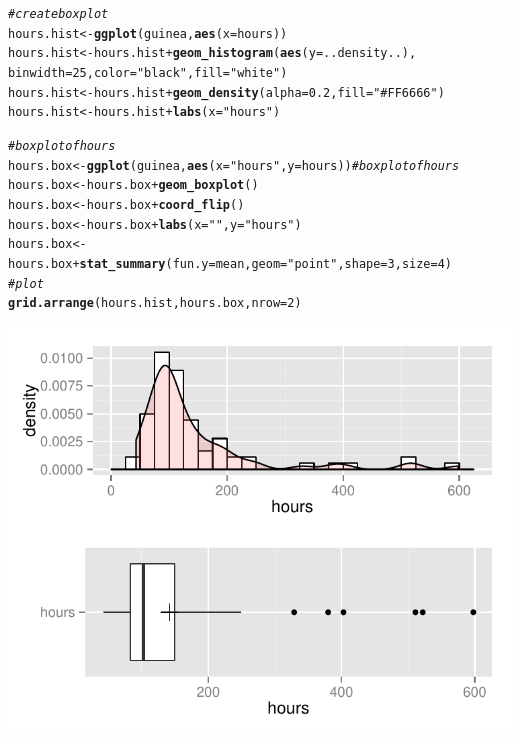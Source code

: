 \documentclass{article}\usepackage[]{graphicx}\usepackage[]{color}
\makeatletter
\def\maxwidth{ %
  \ifdim\Gin@nat@width>\linewidth
    \linewidth
  \else
    \Gin@nat@width
  \fi
}
\newcommand{\hlnum}[1]{\textcolor[rgb]{0.686,0.059,0.569}{#1}}%
\newcommand{\hlstr}[1]{\textcolor[rgb]{0.192,0.494,0.8}{#1}}%
\newcommand{\hlcom}[1]{\textcolor[rgb]{0.678,0.584,0.686}{\textit{#1}}}%
\newcommand{\hlopt}[1]{\textcolor[rgb]{0,0,0}{#1}}%
\newcommand{\hlstd}[1]{\textcolor[rgb]{0.345,0.345,0.345}{#1}}%
\newcommand{\hlkwb}[1]{\textcolor[rgb]{0.69,0.353,0.396}{#1}}%
\newcommand{\hlkwc}[1]{\textcolor[rgb]{0.333,0.667,0.333}{#1}}%
\newcommand{\hlkwd}[1]{\textcolor[rgb]{0.737,0.353,0.396}{\textbf{#1}}}%
\newenvironment{kframe}{%
 \def\at@end@of@kframe{}%
 \ifinner\ifhmode%
  \def\at@end@of@kframe{\end{minipage}}%
  \begin{minipage}{\columnwidth}%
 \fi\fi%
 \def\FrameCommand##1{\hskip\@totalleftmargin \hskip-\fboxsep
 \colorbox{shadecolor}{##1}\hskip-\fboxsep
     \hskip-\linewidth \hskip-\@totalleftmargin \hskip\columnwidth}%
 \MakeFramed {\advance\hsize-\width
   \@totalleftmargin\z@ \linewidth\hsize
   \@setminipage}}%
 {\par\unskip\endMakeFramed%
 \at@end@of@kframe}
\newenvironment{knitrout}{}{} %
\makeatother
\begin{document}
\begin{knitrout}
\color{fgcolor}\begin{kframe}
\begin{alltt}
\hlcom{#create box plot}
\hlstd{hours.hist} \hlkwb{<-} \hlkwd{ggplot}\hlstd{(guinea,} \hlkwd{aes}\hlstd{(}\hlkwc{x} \hlstd{= hours))}
\hlstd{hours.hist} \hlkwb{<-} \hlstd{hours.hist} \hlopt{+} \hlkwd{geom_histogram}\hlstd{(}\hlkwd{aes}\hlstd{(} \hlkwc{y}\hlstd{= ..density..),}
                                          \hlkwc{binwidth} \hlstd{=} \hlnum{25}\hlstd{,}\hlkwc{color} \hlstd{=} \hlstr{"black"}\hlstd{,} \hlkwc{fill} \hlstd{=} \hlstr{"white"}\hlstd{)}
\hlstd{hours.hist} \hlkwb{<-} \hlstd{hours.hist} \hlopt{+} \hlkwd{geom_density}\hlstd{(}\hlkwc{alpha} \hlstd{=} \hlnum{0.2}\hlstd{,} \hlkwc{fill} \hlstd{=} \hlstr{"#FF6666"}\hlstd{)}
\hlstd{hours.hist} \hlkwb{<-} \hlstd{hours.hist} \hlopt{+} \hlkwd{labs}\hlstd{(}\hlkwc{x} \hlstd{=} \hlstr{"hours"}\hlstd{)}

\hlcom{# boxplot of hours}
\hlstd{hours.box} \hlkwb{<-} \hlkwd{ggplot}\hlstd{(guinea,} \hlkwd{aes}\hlstd{(}\hlkwc{x} \hlstd{=} \hlstr{"hours"}\hlstd{,} \hlkwc{y} \hlstd{= hours))} \hlcom{# boxplot of hours}
\hlstd{hours.box} \hlkwb{<-} \hlstd{hours.box} \hlopt{+} \hlkwd{geom_boxplot}\hlstd{()}
\hlstd{hours.box} \hlkwb{<-} \hlstd{hours.box} \hlopt{+} \hlkwd{coord_flip}\hlstd{()}
\hlstd{hours.box} \hlkwb{<-} \hlstd{hours.box} \hlopt{+} \hlkwd{labs}\hlstd{(}\hlkwc{x} \hlstd{=} \hlstr{""}\hlstd{,} \hlkwc{y} \hlstd{=} \hlstr{"hours"}\hlstd{)}
\hlstd{hours.box} \hlkwb{<-} \hlstd{hours.box} \hlopt{+} \hlkwd{stat_summary}\hlstd{(}\hlkwc{fun.y} \hlstd{= mean,} \hlkwc{geom} \hlstd{=} \hlstr{"point"}\hlstd{,} \hlkwc{shape} \hlstd{=} \hlnum{3}\hlstd{,} \hlkwc{size} \hlstd{=} \hlnum{4}\hlstd{)}
\hlcom{# plot}
\hlkwd{grid.arrange}\hlstd{(hours.hist, hours.box,} \hlkwc{nrow} \hlstd{=} \hlnum{2}\hlstd{)}
\end{alltt}
\end{kframe}

{\centering \includegraphics[width=\maxwidth]{figure/2_a_plot-1} 

}



\end{knitrout}
\end{document}
